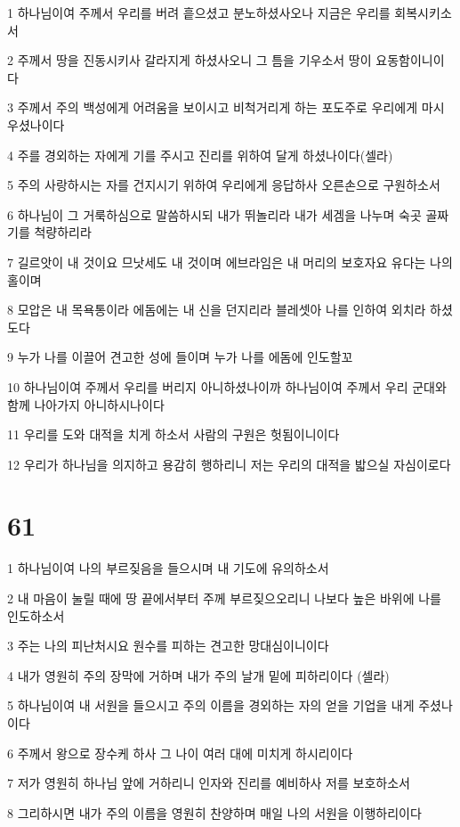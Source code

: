 \par 1 하나님이여 주께서 우리를 버려 흩으셨고 분노하셨사오나 지금은 우리를 회복시키소서
\par 2 주께서 땅을 진동시키사 갈라지게 하셨사오니 그 틈을 기우소서 땅이 요동함이니이다
\par 3 주께서 주의 백성에게 어려움을 보이시고 비척거리게 하는 포도주로 우리에게 마시우셨나이다
\par 4 주를 경외하는 자에게 기를 주시고 진리를 위하여 달게 하셨나이다(셀라)
\par 5 주의 사랑하시는 자를 건지시기 위하여 우리에게 응답하사 오른손으로 구원하소서
\par 6 하나님이 그 거룩하심으로 말씀하시되 내가 뛰놀리라 내가 세겜을 나누며 숙곳 골짜기를 척량하리라
\par 7 길르앗이 내 것이요 므낫세도 내 것이며 에브라임은 내 머리의 보호자요 유다는 나의 홀이며
\par 8 모압은 내 목욕통이라 에돔에는 내 신을 던지리라 블레셋아 나를 인하여 외치라 하셨도다
\par 9 누가 나를 이끌어 견고한 성에 들이며 누가 나를 에돔에 인도할꼬
\par 10 하나님이여 주께서 우리를 버리지 아니하셨나이까 하나님이여 주께서 우리 군대와 함께 나아가지 아니하시나이다
\par 11 우리를 도와 대적을 치게 하소서 사람의 구원은 헛됨이니이다
\par 12 우리가 하나님을 의지하고 용감히 행하리니 저는 우리의 대적을 밟으실 자심이로다

\chapter{61}

\par 1 하나님이여 나의 부르짖음을 들으시며 내 기도에 유의하소서
\par 2 내 마음이 눌릴 때에 땅 끝에서부터 주께 부르짖으오리니 나보다 높은 바위에 나를 인도하소서
\par 3 주는 나의 피난처시요 원수를 피하는 견고한 망대심이니이다
\par 4 내가 영원히 주의 장막에 거하며 내가 주의 날개 밑에 피하리이다 (셀라)
\par 5 하나님이여 내 서원을 들으시고 주의 이름을 경외하는 자의 얻을 기업을 내게 주셨나이다
\par 6 주께서 왕으로 장수케 하사 그 나이 여러 대에 미치게 하시리이다
\par 7 저가 영원히 하나님 앞에 거하리니 인자와 진리를 예비하사 저를 보호하소서
\par 8 그리하시면 내가 주의 이름을 영원히 찬양하며 매일 나의 서원을 이행하리이다

